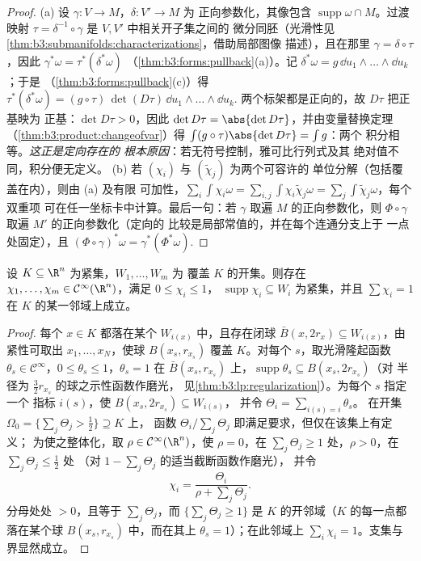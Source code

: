 \begin{proof}
(a) 设 $\gamma\colon V \to M$，$\delta\colon V' \to M$ 为
正向参数化，其像包含
$\operatorname{supp}\omega\cap M$。过渡映射 $\tau =
\delta^{-1}\circ\gamma$ 是 $V, V'$ 中相关开子集之间的
微分同胚（光滑性见
\cref{thm:b3:submanifolds:characterizations}，借助局部图像
描述），且在那里 $\gamma = \delta\circ\tau$，因此
$\gamma^*\omega = \tau^*(\delta^*\omega)$
（\cref{thm:b3:forms:pullback}(a)）。记 $\delta^*\omega =
g\,\dd u_1\wedge\dots\wedge\dd u_k$；于是
（\cref{thm:b3:forms:pullback}(c)）得 $\tau^*(\delta^*\omega) =
(g\circ\tau)\,\det(D\tau)\,\dd u_1\wedge\dots\wedge\dd u_k$.
两个标架都是正向的，故 $D\tau$ 把正基映为
正基：$\det D\tau > 0$，因此 $\det D\tau =
\abs{\det D\tau}$，并由变量替换定理
（\cref{thm:b3:product:changeofvar}）得
$\int(g\circ\tau)\abs{\det D\tau} = \int g$：两个
积分相等。\emph{这正是定向存在的
根本原因}：若无符号控制，雅可比行列式及其
绝对值不同，积分便无定义。
(b) 若 $(\chi_i)$ 与 $(\tilde\chi_j)$ 为两个可容许的
单位分解（包括覆盖在内），则由 (a) 及有限
可加性，$\sum_i\int\chi_i\omega =
\sum_{i,j}\int\chi_i\tilde\chi_j\omega =
\sum_j\int\tilde\chi_j\omega$，每个双重项
可在任一坐标卡中计算。最后一句：若 $\gamma$ 取遍
$M$ 的正向参数化，则 $\Phi\circ\gamma$ 取遍
$M'$ 的正向参数化（定向的
比较是局部常值的，并在每个连通分支上于
一点处固定），且 $(\Phi\circ\gamma)^*\omega =
\gamma^*(\Phi^*\omega)$.
\end{proof}

\begin{lemma}
\label{lem:b3:forms:partition}
设 $K \subseteq \R^n$ 为紧集，$W_1, \dots, W_m$ 为
覆盖 $K$ 的开集。则存在 $\chi_1, \dots, \chi_m \in
\mathcal C^\infty(\R^n)$，满足 $0 \leq \chi_i \leq 1$，
$\operatorname{supp}\chi_i \subseteq W_i$ 为紧集，并且
$\sum\chi_i = 1$ 在
$K$ 的某一邻域上成立。
\end{lemma}

\begin{proof}
每个 $x \in K$ 都落在某个 $W_{i(x)}$ 中，且存在闭球
$\bar B(x, 2r_x) \subseteq W_{i(x)}$，由紧性可取出
$x_1, \dots, x_N$，使球 $B(x_s, r_{x_s})$ 覆盖
$K$。对每个 $s$，取光滑隆起函数 $\theta_s \in \mathcal
C^\infty$，$0 \leq \theta_s \leq 1$，$\theta_s = 1$ 在
$\bar B(x_s, r_{x_s})$ 上，$\operatorname{supp}\theta_s
\subseteq B(x_s, 2r_{x_s})$（对
半径为 $\frac32r_{x_s}$ 的球之示性函数作磨光，
见\cref{thm:b3:lp:regularization}）。为每个 $s$ 指定一个
指标 $i(s)$，使 $B(x_s, 2r_{x_s}) \subseteq W_{i(s)}$，
并令 $\Theta_i = \sum_{i(s) = i}\theta_s$。
在开集 $\Omega_0 = \{\sum_j\Theta_j > \tfrac12\} \supseteq K$ 上，
函数 $\Theta_i/\sum_j\Theta_j$ 即满足要求，但仅在该集上有定义；
为使之整体化，取 $\rho \in \mathcal
C^\infty(\R^n)$，使 $\rho = 0$，在 $\sum_j\Theta_j
\geq 1$ 处，$\rho > 0$，在 $\sum_j\Theta_j \leq \tfrac12$ 处
（对 $1 - \sum_j\Theta_j$ 的适当截断函数作磨光），
并令
\[
\chi_i = \frac{\Theta_i}{\rho + \sum_j\Theta_j} .
\]
分母处处 $> 0$，且等于
$\sum_j\Theta_j$，而 $\{\sum_j\Theta_j \geq 1\}$ 是
$K$ 的开邻域（$K$ 的每一点都落在某个球
$B(x_s, r_{x_s})$ 中，而在其上 $\theta_s = 1$）；在此邻域上
$\sum_i\chi_i = 1$。支集与界显然成立。
\end{proof}

